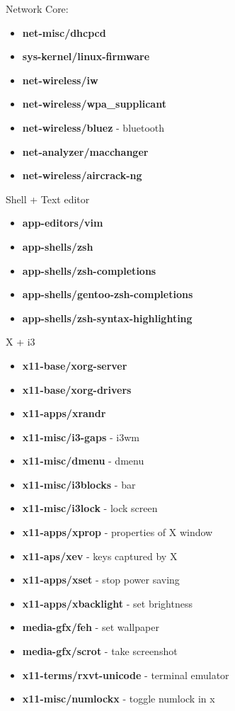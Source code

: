 \documentclass[10pt, a4paper, onecolumn, openany]{book}         %
\begin{document}
Network Core:
\begin{itemize}
    \item \textbf{net-misc/dhcpcd}
    \item \textbf{sys-kernel/linux-firmware}
    \item \textbf{net-wireless/iw}
    \item \textbf{net-wireless/wpa\_supplicant}
    \item \textbf{net-wireless/bluez} - bluetooth
    \item \textbf{net-analyzer/macchanger}
    \item \textbf{net-wireless/aircrack-ng}
\end{itemize}
Shell + Text editor
\begin{itemize}
    \item \textbf{app-editors/vim}
    \item \textbf{app-shells/zsh}
    \item \textbf{app-shells/zsh-completions}
    \item \textbf{app-shells/gentoo-zsh-completions}
    \item \textbf{app-shells/zsh-syntax-highlighting}
\end{itemize}
X + i3
\begin{itemize}
    \item \textbf{x11-base/xorg-server}
    \item \textbf{x11-base/xorg-drivers}
    \item \textbf{x11-apps/xrandr}
    \item \textbf{x11-misc/i3-gaps}     - i3wm
    \item \textbf{x11-misc/dmenu}       - dmenu
    \item \textbf{x11-misc/i3blocks}    - bar
    \item \textbf{x11-misc/i3lock}      - lock screen
    \item \textbf{x11-apps/xprop}       - properties of X window
    \item \textbf{x11-aps/xev}          - keys captured by X
    \item \textbf{x11-apps/xset}        - stop power saving
    \item \textbf{x11-apps/xbacklight}  - set brightness
    \item \textbf{media-gfx/feh}        - set wallpaper
    \item \textbf{media-gfx/scrot}      - take screenshot
    \item \textbf{x11-terms/rxvt-unicode} - terminal emulator
    \item \textbf{x11-misc/numlockx} - toggle numlock in x
\end{itemize}
\end{document}
